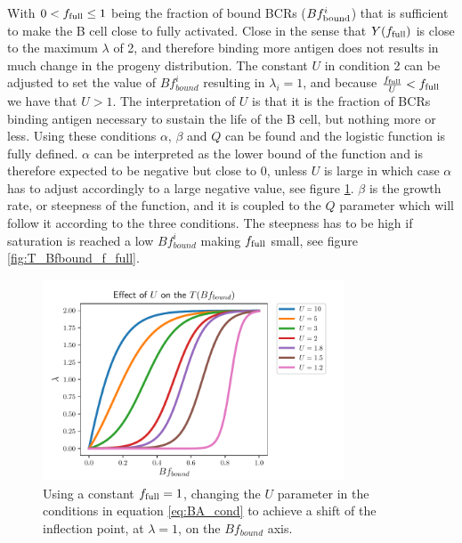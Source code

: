 With $0 < f_{\text{full}} \leq 1$ being the fraction of bound BCRs ($Bf^i_{\text{bound}}$) that is sufficient to make the B cell close to fully activated.
Close in the sense that $Y(f_{\text{full}})$ is close to the maximum $\lambda$ of 2, and therefore binding more antigen does not results in much change in the progeny distribution.
The constant $U$ in condition 2 can be adjusted to set the value of $Bf^i_{bound}$ resulting in $\lambda_i = 1$, and because $\frac{f_{\text{full}}}{U} < f_{\text{full}}$ we have that $U > 1$.
The interpretation of $U$ is that it is the fraction of BCRs binding antigen necessary to sustain the life of the B cell, but nothing more or less.
Using these conditions $\alpha$, $\beta$ and $Q$ can be found and the logistic function is fully defined.
$\alpha$ can be interpreted as the lower bound of the function and is therefore expected to be negative but close to 0, unless $U$ is large in which case $\alpha$ has to adjust accordingly to a large negative value, see figure \ref{fig:T_Bfbound_U}.
$\beta$ is the growth rate, or steepness of the function, and it is coupled to the $Q$ parameter which will follow it according to the three conditions.
The steepness has to be high if saturation is reached a low $Bf^i_{bound}$ making $f_{\text{full}}$ small, see figure \ref{fig:T_Bfbound_f_full}.
\vfill

\begin{figure}
    \centering
    \includegraphics[width=0.8\textwidth]{figures/T_Bfbound_U.pdf}
    \caption{
        \label{fig:T_Bfbound_U}
        Using a constant $f_{\text{full}} = 1$, changing the $U$ parameter in the conditions in equation \ref{eq:BA_cond} to achieve a shift of the inflection point, at $\lambda=1$, on the $Bf_{bound}$ axis.
    }
\end{figure}

